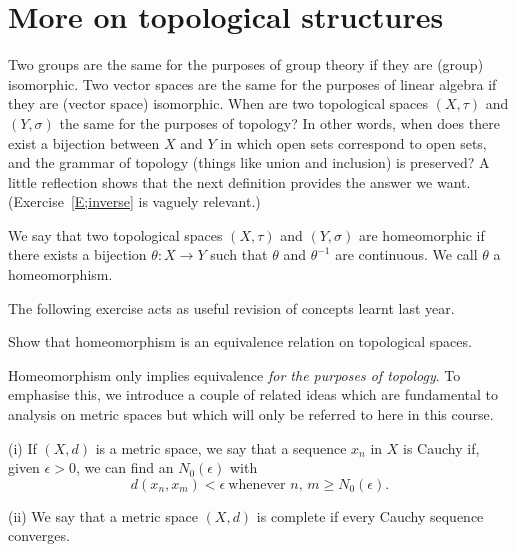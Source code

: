 \section{More on topological structures} Two groups 
are the same for the
purposes of group theory if they are (group) isomorphic.
Two vector spaces are the same for the purposes of 
linear algebra if they are (vector space) isomorphic.
When are two topological spaces $(X,\tau)$
and $(Y,\sigma)$ the same for
the purposes of topology? In other words, when
does there exist a bijection between $X$ and $Y$
in which open sets correspond to open sets,
and the grammar of topology (things like union and inclusion)
is preserved? A little reflection shows that the
next definition provides the answer we want.
(Exercise~\ref{E;inverse} is vaguely relevant.)
\begin{definition}\label{D;homeomorphisms} 
We say that two topological spaces
$(X,\tau)$ and $(Y,\sigma)$ are homeomorphic if there
exists a bijection 
$\theta:X\rightarrow Y$ such that $\theta$ and $\theta^{-1}$
are continuous. We call $\theta$ a homeomorphism.
\end{definition}
The following exercise acts as useful revision of concepts
learnt last year.
\begin{exercise} Show that homeomorphism is an equivalence
relation on topological spaces.
\end{exercise}
Homeomorphism only implies 
equivalence\label{R;topological properties} 
\emph{for the purposes of topology}. 
To emphasise this, we introduce a couple of related ideas which are
fundamental to analysis on metric spaces but which will
only be referred to here in this course.
\begin{definition}\label{D;completeness} 
(i) If $(X,d)$ is a metric space,
we say that a sequence $x_{n}$ in $X$ is Cauchy if, given
$\epsilon>0$, we can find an $N_{0}(\epsilon)$ with
\[d(x_{n},x_{m})<\epsilon\ \text{whenever $n,\,m\geq N_{0}(\epsilon)$}.\]

(ii) We say that a metric space $(X,d)$ is complete if every Cauchy sequence converges.
\end{definition}

